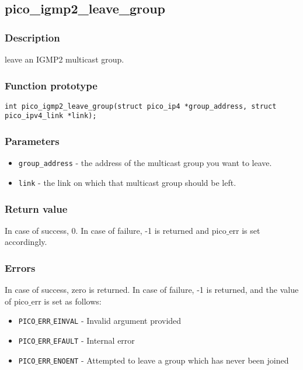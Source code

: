 

\subsection{pico\_igmp2\_leave\_group}

\subsubsection*{Description}
leave an IGMP2 multicast group.

\subsubsection*{Function prototype}
\texttt{int pico\_igmp2\_leave\_group(struct pico\_ip4 *group\_address, struct pico\_ipv4\_link *link);}

\subsubsection*{Parameters}
\begin{itemize}[noitemsep]
\item \texttt{group\_address} - the address of the multicast group you want to leave.
\item \texttt{link} - the link on which that multicast group should be left.
\end{itemize}

\subsubsection*{Return value}
In case of success, 0. In case of failure, -1 is returned and pico$\_$err is set accordingly.

\subsubsection*{Errors}
In case of success, zero is returned. In case of failure, -1 is returned, and the value of pico$\_$err
is set as follows:

\begin{itemize}[noitemsep]
\item \texttt{PICO$\_$ERR$\_$EINVAL}          - Invalid argument provided
\item \texttt{PICO$\_$ERR$\_$EFAULT}          - Internal error
\item \texttt{PICO$\_$ERR$\_$ENOENT}          - Attempted to leave a group which has never been joined
\end{itemize}


